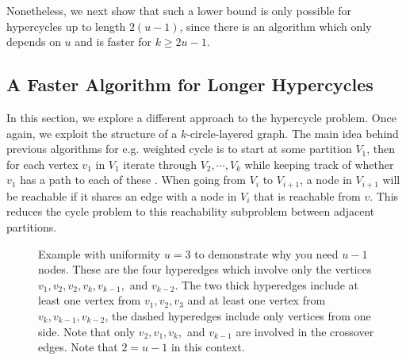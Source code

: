 \documentclass[11pt,letterpaper,pdftex]{article}
\begin{document}
Nonetheless, we next show that such a lower bound is only possible for hypercycles up to length $2(u-1)$, since there is an algorithm which only depends on $u$ and is faster for $k \geq 2u-1$.

\subsection{A Faster Algorithm for Longer Hypercycles} \label{subsec:longer_hypercycles}

In this section, we explore a different approach to the hypercycle problem.
Once again, we exploit the structure of a $k$-circle-layered graph.
The main idea behind previous algorithms for e.g. weighted cycle is to start at some partition $V_1$, then for each vertex $v_1$ in $V_1$ iterate through $V_2,\cdots,V_k$ while keeping track of whether $v_1$ has a path to each of these \cite{LVW18}.
When going from $V_i$ to $V_{i+1}$, a node in $V_{i+1}$ will be reachable if it shares an edge with a node in $V_i$ that is reachable from $v$.
This reduces the cycle problem to this reachability subproblem between adjacent partitions.

\begin{figure}[ht]
    \centering
    
    \caption{Example with uniformity $u=3$ to demonstrate why you need $u-1$ nodes. These are the four hyperedges which involve only the vertices $v_1,v_2, v_2, v_k, v_{k-1},$ and $v_{k-2}$. The two thick hyperedges include at least one vertex from $v_1, v_2, v_3$ and at least one vertex from $v_k,v_{k-1},v_{k-2}$, the dashed hyperedges include only vertices from one side. Note that only $v_2, v_1, v_k,$ and $v_{k-1}$ are involved in the crossover edges. Note that $2 = u-1$ in this context.}
    \label{fig:reachabilityHypercycle}
\end{figure}
\end{document}
